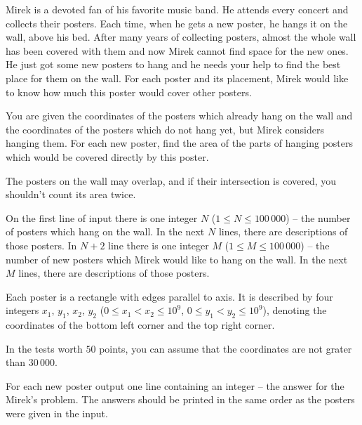 

\usepackage{tikz}





Mirek is a devoted fan of his favorite music band.
He attends every concert and collects their posters.
Each time, when he gets a new poster, he hangs it on the wall, above his bed.
After many years of collecting posters, almost the whole wall has been covered with them
	and now Mirek cannot find space for the new ones.
He just got some new posters to hang and he needs your help to find the best place for them on the wall.
For each poster and its placement, Mirek would like to know how much this poster would cover other posters.


You are given the coordinates of the posters which already hang on the wall
	and the coordinates of the posters which do not hang yet, but Mirek considers hanging them.
For each new poster, find the area of the parts of hanging posters which would be covered directly by this poster.

The posters on the wall may overlap, and if their intersection is covered, you shouldn't count its area twice.


On the first line of input there is one integer $N$ ($1 \le N \le 100\,000$)
	-- the number of posters which hang on the wall.
In the next $N$ lines, there are descriptions of those posters.
In $N+2$ line there is one integer $M$ ($1 \le M \le 100\,000$)
	-- the number of new posters which Mirek would like to hang on the wall.
In the next $M$ lines, there are descriptions of those posters.

Each poster is a rectangle with edges parallel to axis.
It is described by four integers $x_1$, $y_1$, $x_2$, $y_2$
	($0 \le x_1 < x_2 \le 10^9$, $0 \le y_1 < y_2 \le 10^9$),
	denoting the coordinates of the bottom left corner and the top right corner.

In the tests worth $50$ points, you can assume that the coordinates are not grater than $30\,000$.


For each new poster output one line containing an integer -- the answer for the Mirek's problem.
The answers should be printed in the same order as the posters were given in the input.

